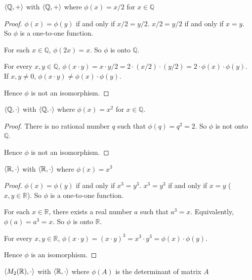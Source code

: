 \begin{exercise}
    $\left\langle{\mathbb{Q}, +}\right\rangle$ with $\left\langle{\mathbb{Q}, +}\right\rangle$ where $\phi(x) = x/2$ for $x\in\mathbb{Q}$
\end{exercise}

\begin{proof}
    $\phi(x) = \phi(y)$ if and only if $x/2 = y/2$. $x/2 = y/2$ if and only if $x = y$. So $\phi$ is a one-to-one function.

    For each $x\in\mathbb{Q}$, $\phi(2x) = x$. So $\phi$ is onto $\mathbb{Q}$.

    For every $x, y\in\mathbb{Q}$, $\phi(x\cdot y) = x\cdot y/2 = 2\cdot(x/2)\cdot(y/2) = 2\cdot\phi(x)\cdot\phi(y)$. If $x, y\ne 0$, $\phi(x\cdot y) \ne \phi(x)\cdot\phi(y)$.

    Hence $\phi$ is not an isomorphism.
\end{proof}

\begin{exercise}
    $\left\langle{\mathbb{Q},\cdot}\right\rangle$ with $\left\langle{\mathbb{Q},\cdot}\right\rangle$ where $\phi(x) = x^{2}$ for $x\in\mathbb{Q}$.
\end{exercise}

\begin{proof}
    There is no rational number $q$ such that $\phi(q) = q^{2} = 2$. So $\phi$ is not onto $\mathbb{Q}$.

    Hence $\phi$ is not an isomorphism.
\end{proof}

\begin{exercise}
    $\left\langle{\mathbb{R},\cdot}\right\rangle$ with $\left\langle{\mathbb{R},\cdot}\right\rangle$ where $\phi(x) = x^{3}$
\end{exercise}

\begin{proof}
    $\phi(x) = \phi(y)$ if and only if $x^{3} = y^{3}$. $x^{3} = y^{3}$ if and only if $x = y$ ($x, y\in\mathbb{R}$). So $\phi$ is a one-to-one function.

    For each $x\in\mathbb{R}$, there exists a real number $a$ such that $a^{3} = x$. Equivalently, $\phi(a) = a^{3} = x$. So $\phi$ is onto $\mathbb{R}$.

    For every $x, y\in\mathbb{R}$, $\phi(x\cdot y) = {(x\cdot y)}^{3} = x^{3}\cdot y^{3} = \phi(x)\cdot\phi(y)$.

    Hence $\phi$ is an isomorphism.
\end{proof}

\begin{exercise}
    $\left\langle{M_{2}(\mathbb{R}), \cdot}\right\rangle$ with $\left\langle{\mathbb{R},\cdot}\right\rangle$ where $\phi(A)$ is the determinant of matrix $A$
\end{exercise}

